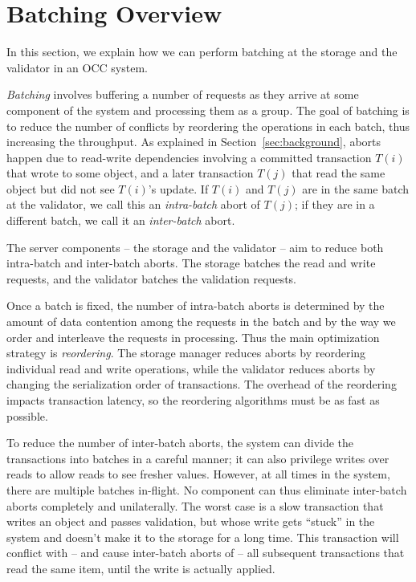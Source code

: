 \section{Batching Overview}\label{sec:overview}

In this section, we explain how we can perform batching at the storage and the validator in an OCC system. 

\emph{Batching} involves buffering a number of requests as they arrive at some component of the system and processing them as a group. The goal of batching is to reduce the number of conflicts by reordering the operations in each batch, thus increasing the throughput. As explained in Section~\ref{sec:background}, aborts happen due to read-write dependencies involving a committed transaction $T(i)$ that wrote to some object, and a later transaction $T(j)$ that read the same object but did not see $T(i)$'s update. If $T(i)$ and $T(j)$ are in the same batch at the validator, we call this an \emph{intra-batch} abort of $T(j)$; if they are in a different batch, we call it an \emph{inter-batch} abort.

The server components -- the storage and the validator -- aim to reduce both intra-batch and inter-batch aborts. The storage batches the read and write requests, and the validator batches the validation requests.

Once a batch is fixed, the number of intra-batch aborts is determined by the amount of data contention among the requests in the batch and by the way we order and interleave the requests in processing. Thus the main optimization strategy is \emph{reordering}. The storage manager reduces aborts by reordering individual read and write operations, while the validator reduces aborts by changing the serialization order of transactions. The overhead of the reordering impacts transaction latency, so the reordering algorithms must be as fast as possible.

To reduce the number of inter-batch aborts, the system can divide the transactions into batches in a careful manner; it can also privilege writes over reads to allow reads to see fresher values. However, at all times in the system, there are multiple batches in-flight. No component can thus eliminate inter-batch aborts completely and unilaterally. The worst case is a slow transaction that writes an object and passes validation, but whose write gets ``stuck'' in the system and doesn't make it to the storage for a long time. This transaction will conflict with -- and cause inter-batch aborts of -- all subsequent transactions that read the same item, until the write is actually applied.

